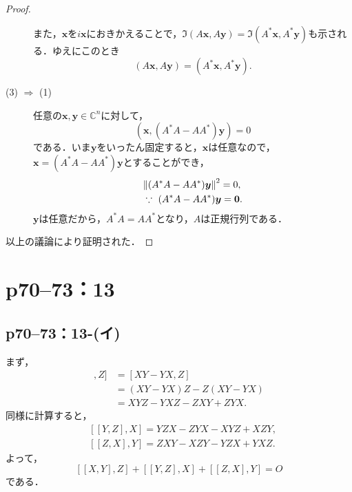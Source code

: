 \documentclass[a4paper,10pt,fleqn]{ltjsarticle}
\begin{document}
\begin{tleftbar}
\begin{proof}
\begin{description}
            また，$\bm{x}$を$i\bm{x}$におきかえることで，$ \Im (A\bm{x}, A\bm{y}) = \Im (A^\ast \bm{x}, A^\ast\bm{y})$も示される．ゆえにこのとき
            \[
              (A\bm{x}, A\bm{y}) = (A^\ast \bm{x}, A^\ast\bm{y}).
            \]
      \item[(3) $\Longrightarrow$ (1)] 任意の$\bm{x},\bm{y} \in \mathbb{C}^n$に対して，
            \[
              (\bm{x}, (A^\ast A-A A^\ast)\bm{y}) =0
            \]
            である．いま$\bm{y}$をいったん固定すると，$\bm{x}$は任意なので，$\bm{x}=(A^\ast A-A A^\ast)\bm{y}$とすることができ，
            \begin{align*}
               & \norm{(A^\ast A-A A^\ast)\bm{y}}^2  = 0,       \\
               & \because ~ (A^\ast A-A A^\ast)\bm{y} = \bm{0}.
            \end{align*}
            $\bm{y}$は任意だから，$A^\ast A=A A^\ast$となり，$A$は正規行列である．
    \end{description}
    以上の議論により証明された．
  \end{proof}
\end{tleftbar}

\newpage


\section*{p70--73：13}

\subsection*{p70--73：13-(イ)}

\begin{tleftbar}
  まず，
  \begin{align*}
    [ [X,Y],Z ] & = [XY-YX,Z]           \\
                & = (XY-YX)Z -Z(XY-YX)  \\
                & = XYZ -YXZ -ZXY +ZYX.
  \end{align*}
  同様に計算すると，
  \begin{align*}
     & [[Y,Z],X] = YZX -ZYX -XYZ +XZY,  \\
     & [ [Z,X],Y] = ZXY -XZY -YZX +YXZ.
  \end{align*}
  よって，
  \[
    [[X,Y],Z] +[[Y,Z],X]+[[Z,X],Y]=O
  \]
  である．
\end{tleftbar}
\end{document}
